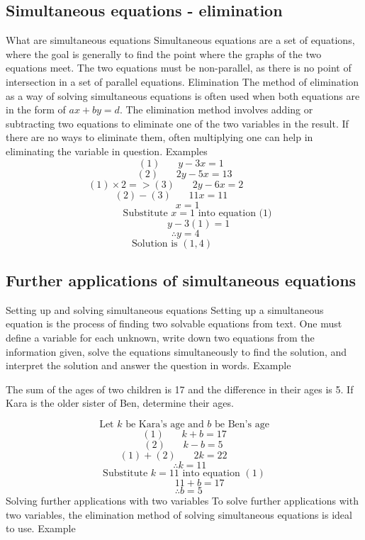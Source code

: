 \begin{outline}
\0
\subsection{Simultaneous equations - elimination}
	\1 What are simultaneous equations
		\2 Simultaneous equations are a set of equations, where the goal is generally to find the point where the graphs of the two equations meet. The two equations must be non-parallel, as there is no point of intersection in a set of parallel equations.
	\1 Elimination
		\2 The method of elimination as a way of solving simultaneous equations is often used when both equations are in the form of $ax + by = d$. The elimination method involves adding or subtracting two equations to eliminate one of the two variables in the result. If there are no ways to eliminate them, often multiplying one can help in eliminating the variable in question.
			\3 Examples
				\[(1)\ \ \ \ \ \ \ \ y - 3x = 1\ \ \ \]
				\[(2)\ \ \ \ \ \ \ \ 2y - 5x = 13\]
				\[(1)\times2 => (3)\ \ \ \ \ \ \ \ 2y - 6x = 2\ \ \ \ \ \ \ \ \ \ \ \ \ \ \ \ \ \]
				\[(2)-(3)\ \ \ \ \ \ \ \ 11x = 11\ \ \ \ \ \ \ \ \ \ \ \ \]
				\[\ \ \ x = 1\]
				\[\ \ \ \ \ \ \ \ \ \ \ \ \text{Substitute $x = 1$ into equation (1)}\]
				\[\ \ \ \ \ \ \ \ \ \ \ \ \ y - 3(1) = 1\]
				\[\ \therefore y = 4\]
				\[\text{Solution is }(1,4)\ \ \ \ \ \ \ \ \ \ \ \]
				
\0
\subsection{Further applications of simultaneous equations}
	\1 Setting up and solving simultaneous equations
		\2 Setting up a simultaneous equation is the process of finding two solvable equations from text. One must define a variable for each unknown, write down two equations from the information given, solve the equations simultaneously to find the solution, and interpret the solution and answer the question in words.
			\3 Example

				The sum of the ages of two children is 17 and the difference in their ages is 5. If Kara is the older sister of Ben, determine their ages.
				
				\[\text{Let $k$ be Kara's age and $b$ be Ben's age}\]
				\[(1)\ \ \ \ \ \ \ \ k + b = 17\]
				\[(2)\ \ \ \ \ \ \ \ k - b = 5\ \]
				\[\ \ (1)+(2)\ \ \ \ \ \ \ \ 2k = 22\ \ \ \ \ \ \ \ \ \ \ \ \]
				\[\ \ \ \ \ \therefore k = 11\]
				\[\text{Substitute } k = 11 \text{ into equation } (1)\]
				\[\ \ \ \ \ \ \ \ \ \ \ \ \ \ 11 + b = 17\]
				\[\ \ \ \ \therefore b = 5\]
	\1 Solving further applications with two variables
		\2 To solve further applications with two variables, the elimination method of solving simultaneous equations is ideal to use.
			\3 Example


\end{outline}
